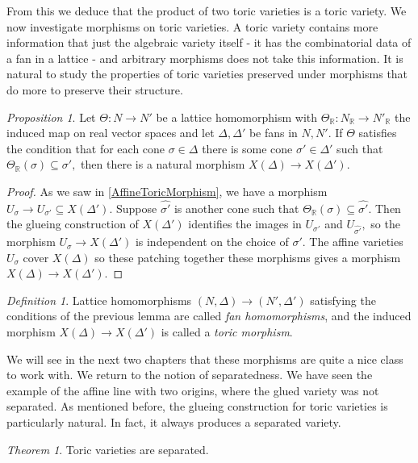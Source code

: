 \documentclass[BSc]{usydthesis}
\numberwithin{equation}{chapter}
\theoremstyle{remark}
\newtheorem{Definition}[equation]{Definition}
\newtheorem{Theorem}[equation]{Theorem}
\newtheorem{Proposition}[equation]{Proposition}
\newcommand{\R}{\mathbb{R}}
\begin{document}
From this we deduce that the product of two toric varieties is a toric variety. We now investigate morphisms on toric varieties. A toric variety contains more information that just the algebraic variety itself - it has the combinatorial data of a fan in a lattice - and arbitrary morphisms does not take this information. It is natural to study the properties of toric varieties preserved under morphisms that do more to preserve their structure.

\begin{Proposition}
 Let $\Theta:N\to N'$ be a lattice homomorphism with $\Theta_{\R}:N_{\R} \to N'_{\R}$ the induced map on real vector spaces and let $\Delta, \Delta'$ be fans in $N, N'.$ If $\Theta$ satisfies the condition that for each cone $\sigma\in \Delta$ there is some cone $\sigma'\in \Delta'$ such that $\Theta_{\R}(\sigma)\subseteq \sigma',$ then there is a natural morphism $X(\Delta) \to X(\Delta').$
\end{Proposition}

\begin{proof}
 As we saw in \ref{AffineToricMorphism}, we have a morphism $U_{\sigma} \to U_{\sigma'}\subseteq X(\Delta').$ Suppose $\hat{\sigma'}$ is another cone such that $\Theta_{\R}(\sigma)\subseteq \hat{\sigma'}.$ Then the glueing construction of $X(\Delta')$ identifies the images in $U_{\sigma'}$ and $U_{\hat{\sigma'}},$ so the morphism $U_{\sigma} \to X(\Delta')$ is independent on the choice of $\sigma'.$ The affine varieties $U_{\sigma}$ cover $X(\Delta)$ so these patching together these morphisms gives a morphism $X(\Delta)\to X(\Delta').$ 
\end{proof}

\begin{Definition}\label{ToricMorphism}
 Lattice homomorphisms $(N, \Delta) \to (N', \Delta')$ satisfying the conditions of the previous lemma are called {\em fan homomorphisms}, and the induced morphism $X(\Delta)\to X(\Delta')$ is called a {\em toric morphism}. 
\end{Definition}


We will see in the next two chapters that these morphisms are quite a nice class to work with. We return to the notion of separatedness. We have seen the example of the affine line with two origins, where the glued variety was not separated. As mentioned before, the glueing construction for toric varieties is particularly natural. In fact, it always produces a separated variety.

\begin{Theorem}
 Toric varieties are separated. 
\end{Theorem}
\end{document}
